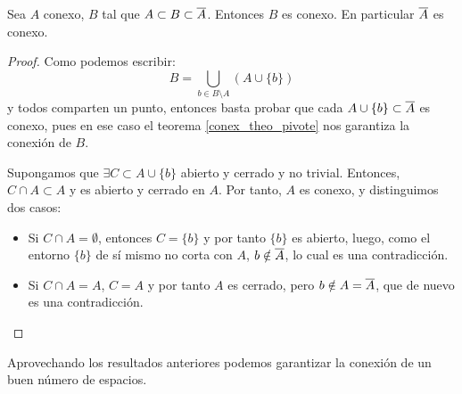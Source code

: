 \begin{theo}
	Sea $A$ conexo, $B$ tal que $A\subset B\subset\overline{A}$. Entonces $B$ es conexo. En particular $\overline{A}$ es conexo.
	
	\begin{proof}
		Como podemos escribir:
		\[B=\bigcup_{b\in B\setminus A} (A\cup\{b\}) \]
		y todos comparten un punto, entonces basta probar que cada $A\cup\{b\}\subset\overline{A}$ es conexo, pues en ese caso el teorema \ref{conex_theo_pivote} nos garantiza la conexión de $B$.
		
		Supongamos que $\exists C\subset A\cup\{b\}$ abierto y cerrado y no trivial. Entonces, $C\cap A\subset A$ y es abierto y cerrado en $A$. Por tanto, $A$ es conexo, y distinguimos dos casos:
		
		\begin{itemize}
			\item Si $C\cap A=\emptyset$, entonces $C=\{b\}$ y por tanto $\{b\}$ es abierto, luego, como el entorno $\{b\}$ de sí mismo no corta con $A$, $b\notin\overline{A}$, lo cual es una contradicción.
			\item Si $C\cap A=A$, $C=A$ y por tanto $A$ es cerrado, pero $b\notin A=\overline{A}$, que de nuevo es una contradicción. \qedhere
		\end{itemize}
	\end{proof}
\end{theo}

Aprovechando los resultados anteriores podemos garantizar la conexión de un buen número de espacios.

